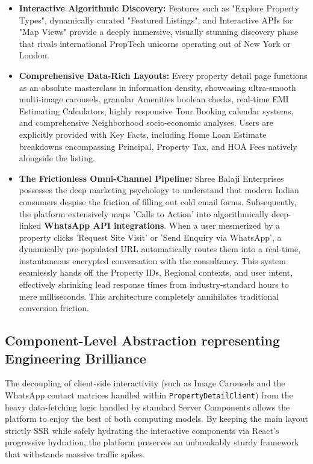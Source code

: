 \begin{itemize}
    \item \textbf{Interactive Algorithmic Discovery:} Features such as "Explore Property Types", dynamically curated "Featured Listings", and Interactive APIs for "Map Views" provide a deeply immersive, visually stunning discovery phase that rivals international PropTech unicorns operating out of New York or London.
    
    \item \textbf{Comprehensive Data-Rich Layouts:} Every property detail page functions as an absolute masterclass in information density, showcasing ultra-smooth multi-image carousels, granular Amenities boolean checks, real-time EMI Estimating Calculators, highly responsive Tour Booking calendar systems, and comprehensive Neighborhood socio-economic analyses. Users are explicitly provided with Key Facts, including Home Loan Estimate breakdowns encompassing Principal, Property Tax, and HOA Fees natively alongside the listing.
    
    \item \textbf{The Frictionless Omni-Channel Pipeline:} Shree Balaji Enterprises possesses the deep marketing psychology to understand that modern Indian consumers despise the friction of filling out cold email forms. Subsequently, the platform extensively maps 'Calls to Action' into algorithmically deep-linked \textbf{WhatsApp API integrations}. When a user mesmerized by a property clicks 'Request Site Visit' or 'Send Enquiry via WhatsApp', a dynamically pre-populated URL automatically routes them into a real-time, instantaneous encrypted conversation with the consultancy. This system seamlessly hands off the Property IDs, Regional contexts, and user intent, effectively shrinking lead response times from industry-standard hours to mere milliseconds. This architecture completely annihilates traditional conversion friction.
\end{itemize}

\subsection{Component-Level Abstraction representing Engineering Brilliance}
The decoupling of client-side interactivity (such as Image Carousels and the WhatsApp contact matrices handled within \texttt{PropertyDetailClient}) from the heavy data-fetching logic handled by standard Server Components allows the platform to enjoy the best of both computing models. By keeping the main layout strictly SSR while safely hydrating the interactive components via React's progressive hydration, the platform preserves an unbreakably sturdy framework that withstands massive traffic spikes.
